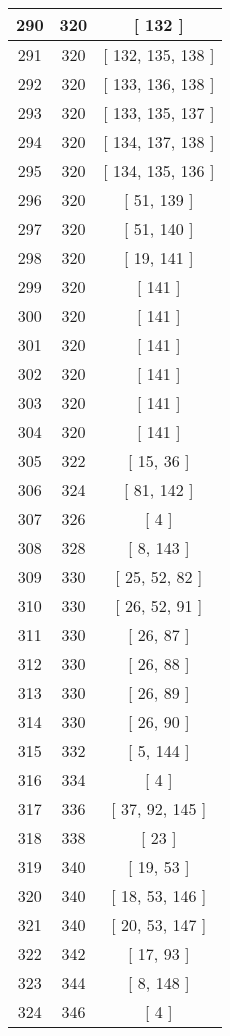 \begin{center}
\begin{longtable}[H]{|| c c c ||}
\hline
290 & 320 & [ 132 ] \\ 
\hline
291 & 320 & [ 132, 135, 138 ] \\ 
\hline
292 & 320 & [ 133, 136, 138 ] \\ 
\hline
293 & 320 & [ 133, 135, 137 ] \\ 
\hline
294 & 320 & [ 134, 137, 138 ] \\ 
\hline
295 & 320 & [ 134, 135, 136 ] \\ 
\hline
296 & 320 & [ 51, 139 ] \\ 
\hline
297 & 320 & [ 51, 140 ] \\ 
\hline
298 & 320 & [ 19, 141 ] \\ 
\hline
299 & 320 & [ 141 ] \\ 
\hline
300 & 320 & [ 141 ] \\ 
\hline
301 & 320 & [ 141 ] \\ 
\hline
302 & 320 & [ 141 ] \\ 
\hline
303 & 320 & [ 141 ] \\ 
\hline
304 & 320 & [ 141 ] \\ 
\hline
305 & 322 & [ 15, 36 ] \\ 
\hline
306 & 324 & [ 81, 142 ] \\ 
\hline
307 & 326 & [ 4 ] \\ 
\hline
308 & 328 & [ 8, 143 ] \\ 
\hline
309 & 330 & [ 25, 52, 82 ] \\ 
\hline
310 & 330 & [ 26, 52, 91 ] \\ 
\hline
311 & 330 & [ 26, 87 ] \\ 
\hline
312 & 330 & [ 26, 88 ] \\ 
\hline
313 & 330 & [ 26, 89 ] \\ 
\hline
314 & 330 & [ 26, 90 ] \\ 
\hline
315 & 332 & [ 5, 144 ] \\ 
\hline
316 & 334 & [ 4 ] \\ 
\hline
317 & 336 & [ 37, 92, 145 ] \\ 
\hline
318 & 338 & [ 23 ] \\ 
\hline
319 & 340 & [ 19, 53 ] \\ 
\hline
320 & 340 & [ 18, 53, 146 ] \\ 
\hline
321 & 340 & [ 20, 53, 147 ] \\ 
\hline
322 & 342 & [ 17, 93 ] \\ 
\hline
323 & 344 & [ 8, 148 ] \\ 
\hline
324 & 346 & [ 4 ] \\ 

\end{longtable}
\end{center}
